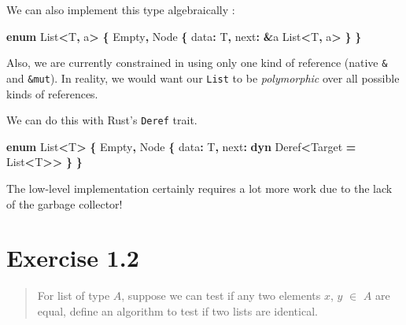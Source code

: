 \documentclass[
]{book}
\newenvironment{Shaded}{\begin{snugshade}}{\end{snugshade}}
\newcommand{\BuiltInTok}[1]{#1}
\newcommand{\KeywordTok}[1]{\textcolor[rgb]{0.13,0.29,0.53}{\textbf{#1}}}
\newcommand{\NormalTok}[1]{#1}
\newcommand{\OperatorTok}[1]{\textcolor[rgb]{0.81,0.36,0.00}{\textbf{#1}}}
\newcommand{\OtherTok}[1]{\textcolor[rgb]{0.56,0.35,0.01}{#1}}
\begin{document}
We can also implement this type algebraically :

\begin{Shaded}
\begin{Highlighting}[]
\KeywordTok{enum}\NormalTok{ List}\OperatorTok{\textless{}}\NormalTok{T}\OperatorTok{,} \OtherTok{\textquotesingle{}a}\OperatorTok{\textgreater{}} \OperatorTok{\{}
\NormalTok{    Empty}\OperatorTok{,}
\NormalTok{    Node }\OperatorTok{\{}
\NormalTok{        data}\OperatorTok{:}\NormalTok{ T}\OperatorTok{,}
\NormalTok{        next}\OperatorTok{:} \OperatorTok{\&}\OtherTok{\textquotesingle{}a}\NormalTok{ List}\OperatorTok{\textless{}}\NormalTok{T}\OperatorTok{,} \OtherTok{\textquotesingle{}a}\OperatorTok{\textgreater{}}
    \OperatorTok{\}}
\OperatorTok{\}}
\end{Highlighting}
\end{Shaded}

Also, we are currently constrained in using only one kind of reference (native \texttt{\&} and \texttt{\&mut}). In reality, we would want our \texttt{List} to be \emph{polymorphic} over all possible kinds of references.

We can do this with Rust's \texttt{Deref} trait.

\begin{Shaded}
\begin{Highlighting}[]
\KeywordTok{enum}\NormalTok{ List}\OperatorTok{\textless{}}\NormalTok{T}\OperatorTok{\textgreater{}} \OperatorTok{\{}
\NormalTok{    Empty}\OperatorTok{,}
\NormalTok{    Node }\OperatorTok{\{}
\NormalTok{        data}\OperatorTok{:}\NormalTok{ T}\OperatorTok{,}
\NormalTok{        next}\OperatorTok{:} \KeywordTok{dyn} \BuiltInTok{Deref}\OperatorTok{\textless{}}\NormalTok{Target }\OperatorTok{=}\NormalTok{ List}\OperatorTok{\textless{}}\NormalTok{T}\OperatorTok{\textgreater{}\textgreater{}}
    \OperatorTok{\}}
\OperatorTok{\}}
\end{Highlighting}
\end{Shaded}

The low-level implementation certainly requires a lot more work due to the lack of the garbage collector!

\hypertarget{exercise-1.2}{%
\section{Exercise 1.2}\label{exercise-1.2}}

\begin{quote}
For list of type \(A\), suppose we can test if any two elements \(x\), \(y\) \(\in\) \(A\) are equal,
define an algorithm to test if two lists are identical.
\end{quote}
\end{document}
